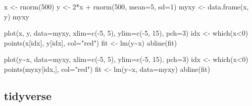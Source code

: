 \documentclass[
]{book}
\newenvironment{Shaded}{\begin{snugshade}}{\end{snugshade}}
\newcommand{\AttributeTok}[1]{\textcolor[rgb]{0.77,0.63,0.00}{#1}}
\newcommand{\DecValTok}[1]{\textcolor[rgb]{0.00,0.00,0.81}{#1}}
\newcommand{\FunctionTok}[1]{\textcolor[rgb]{0.00,0.00,0.00}{#1}}
\newcommand{\NormalTok}[1]{#1}
\newcommand{\OtherTok}[1]{\textcolor[rgb]{0.56,0.35,0.01}{#1}}
\newcommand{\SpecialCharTok}[1]{\textcolor[rgb]{0.00,0.00,0.00}{#1}}
\newcommand{\StringTok}[1]{\textcolor[rgb]{0.31,0.60,0.02}{#1}}
\begin{document}
\begin{Shaded}
\begin{Highlighting}[]
\NormalTok{x }\OtherTok{\textless{}{-}} \FunctionTok{rnorm}\NormalTok{(}\DecValTok{500}\NormalTok{)}
\NormalTok{y }\OtherTok{\textless{}{-}} \DecValTok{2}\SpecialCharTok{*}\NormalTok{x }\SpecialCharTok{+} \FunctionTok{rnorm}\NormalTok{(}\DecValTok{500}\NormalTok{, }\AttributeTok{mean=}\DecValTok{5}\NormalTok{, }\AttributeTok{sd=}\DecValTok{1}\NormalTok{)}
\NormalTok{myxy }\OtherTok{\textless{}{-}} \FunctionTok{data.frame}\NormalTok{(x, y)}
\NormalTok{myxy}

\FunctionTok{plot}\NormalTok{(x, y, }\AttributeTok{data=}\NormalTok{myxy, }\AttributeTok{xlim=}\FunctionTok{c}\NormalTok{(}\SpecialCharTok{{-}}\DecValTok{5}\NormalTok{, }\DecValTok{5}\NormalTok{), }\AttributeTok{ylim=}\FunctionTok{c}\NormalTok{(}\SpecialCharTok{{-}}\DecValTok{5}\NormalTok{, }\DecValTok{15}\NormalTok{), }\AttributeTok{pch=}\DecValTok{3}\NormalTok{)}
\NormalTok{idx }\OtherTok{\textless{}{-}} \FunctionTok{which}\NormalTok{(x}\SpecialCharTok{\textless{}}\DecValTok{0}\NormalTok{)}
\FunctionTok{points}\NormalTok{(x[idx], y[idx], }\AttributeTok{col=}\StringTok{"red"}\NormalTok{)}
\NormalTok{fit }\OtherTok{\textless{}{-}} \FunctionTok{lm}\NormalTok{(y}\SpecialCharTok{\textasciitilde{}}\NormalTok{x)}
\FunctionTok{abline}\NormalTok{(fit)}


\FunctionTok{plot}\NormalTok{(y}\SpecialCharTok{\textasciitilde{}}\NormalTok{x, }\AttributeTok{data=}\NormalTok{myxy, }\AttributeTok{xlim=}\FunctionTok{c}\NormalTok{(}\SpecialCharTok{{-}}\DecValTok{5}\NormalTok{, }\DecValTok{5}\NormalTok{), }\AttributeTok{ylim=}\FunctionTok{c}\NormalTok{(}\SpecialCharTok{{-}}\DecValTok{5}\NormalTok{, }\DecValTok{15}\NormalTok{), }\AttributeTok{pch=}\DecValTok{3}\NormalTok{)}
\NormalTok{idx }\OtherTok{\textless{}{-}} \FunctionTok{which}\NormalTok{(x}\SpecialCharTok{\textless{}}\DecValTok{0}\NormalTok{)}
\FunctionTok{points}\NormalTok{(myxy[idx,], }\AttributeTok{col=}\StringTok{"red"}\NormalTok{)}
\NormalTok{fit }\OtherTok{\textless{}{-}} \FunctionTok{lm}\NormalTok{(y}\SpecialCharTok{\textasciitilde{}}\NormalTok{x, }\AttributeTok{data=}\NormalTok{myxy)}
\FunctionTok{abline}\NormalTok{(fit)}
\end{Highlighting}
\end{Shaded}

\hypertarget{tidyverse-1}{%
\subsection{tidyverse}\label{tidyverse-1}}
\end{document}
